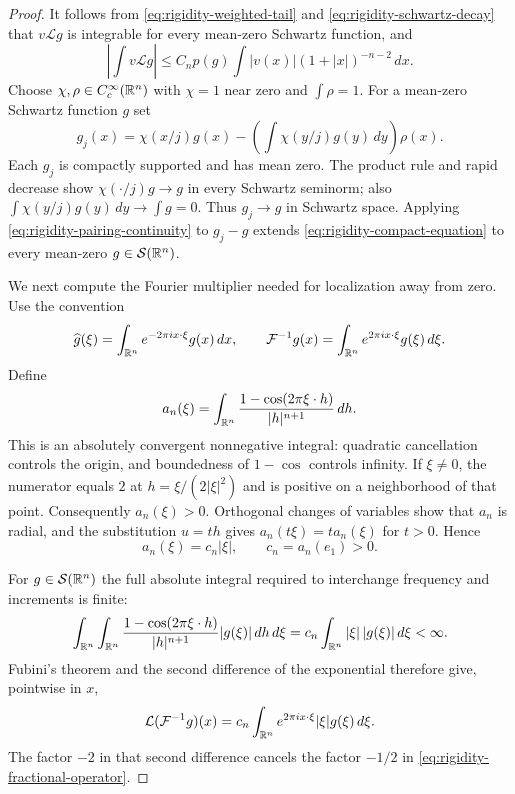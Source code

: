 \begin{proof}
It follows from \eqref{eq:rigidity-weighted-tail} and
\eqref{eq:rigidity-schwartz-decay} that $v\mathcal Lg$ is integrable
for every mean-zero Schwartz function, and
\begin{equation}\label{eq:rigidity-pairing-continuity}
 \left|\int v\mathcal Lg\right|
 \le C_n p(g)\int |v(x)|(1+|x|)^{-n-2}\,dx.
\end{equation}
Choose $\chi,\rho\in C_c^\infty(\mathbb R^n)$ with $\chi=1$ near zero and
$\int\rho=1$.  For a mean-zero Schwartz function $g$ set
\[
 g_j(x)=\chi(x/j)g(x)
        -\left(\int\chi(y/j)g(y)\,dy\right)\rho(x).
\]
Each $g_j$ is compactly supported and has mean zero.
The product rule and rapid decrease show
$\chi(\cdot/j)g\to g$ in every Schwartz seminorm; also
$\int\chi(y/j)g(y)\,dy\to\int g=0$.
Thus $g_j\to g$ in Schwartz space.
Applying \eqref{eq:rigidity-pairing-continuity} to $g_j-g$ extends
\eqref{eq:rigidity-compact-equation} to every mean-zero
$g\in\mathcal S(\mathbb R^n)$.

We next compute the Fourier multiplier needed for localization away from
zero.  Use the convention
\[
 \widehat g(\xi)=\int_{\mathbb R^n}e^{-2\pi i x\cdot\xi}g(x)\,dx,
 \qquad
 \mathcal F^{-1}g(x)=\int_{\mathbb R^n}e^{2\pi i x\cdot\xi}g(\xi)\,d\xi.
\]
Define
\[
 a_n(\xi)=\int_{\mathbb R^n}
        \frac{1-\cos(2\pi\xi\cdot h)}{|h|^{n+1}}\,dh.
\]
This is an absolutely convergent nonnegative integral: quadratic
cancellation controls the origin, and boundedness of $1-\cos$ controls
infinity.  If $\xi\ne0$, the numerator equals $2$ at
$h=\xi/(2|\xi|^2)$ and is positive on a neighborhood of that point.
Consequently $a_n(\xi)>0$.  Orthogonal changes of variables show that
$a_n$ is radial, and the substitution $u=th$ gives
$a_n(t\xi)=t a_n(\xi)$ for $t>0$.  Hence
\begin{equation}\label{eq:rigidity-positive-symbol}
 a_n(\xi)=c_n|\xi|,\qquad c_n=a_n(e_1)>0.
\end{equation}

For $g\in\mathcal S(\mathbb R^n)$ the full absolute integral required to
interchange frequency and increments is finite:
\[
 \int_{\mathbb R^n}\int_{\mathbb R^n}
   \frac{1-\cos(2\pi\xi\cdot h)}{|h|^{n+1}}|g(\xi)|\,dh\,d\xi
 =c_n\int_{\mathbb R^n}|\xi|\,|g(\xi)|\,d\xi<\infty.
\]
Fubini's theorem and the second difference of the exponential therefore
give, pointwise in $x$,
\begin{equation}\label{eq:rigidity-fourier-multiplier}
 \mathcal L(\mathcal F^{-1}g)(x)
   =c_n\int_{\mathbb R^n}e^{2\pi i x\cdot\xi}|\xi|g(\xi)\,d\xi.
\end{equation}
The factor $-2$ in that second difference cancels the factor $-1/2$ in
\eqref{eq:rigidity-fractional-operator}.


\end{proof}
